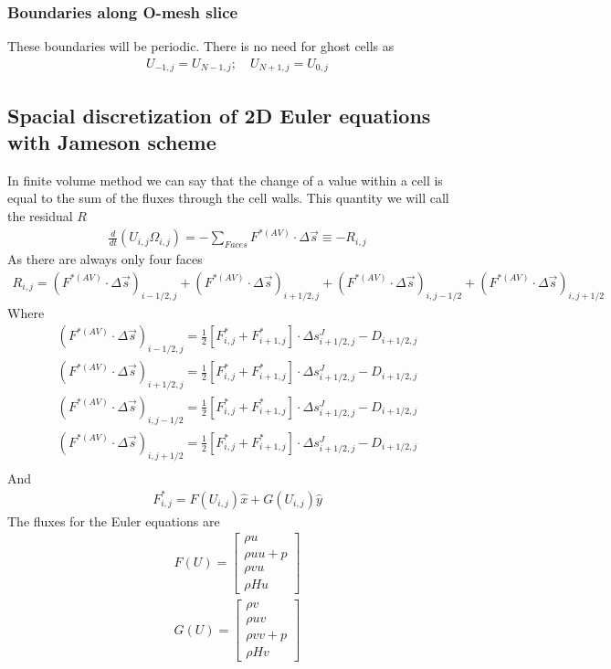 \documentclass[11pt]{article}
\begin{document}
		\subsubsection{Boundaries along O-mesh slice}
		These boundaries will be periodic. There is no need for ghost cells as
			\begin{align}
			U_{-1,j} = U_{N-1,j}; \quad U_{N+1,j} = U_{0,j}
			\end{align}
	\subsection{Spacial discretization of 2D Euler equations with Jameson scheme}
	In finite volume method we can say that the change of a value within a cell is equal to the sum of the fluxes through the cell walls.  This quantity we will call the residual $R$
		\begin{align}
		\frac{d}{dt} (U_{i,j}\Omega_{i,j}) = -\sum_{Faces} F^{*(AV)} \cdot \Delta \vec s \equiv -R_{i,j}
		\end{align}
	As there are always only four faces
		\begin{align}
		R_{i,j} = (F^{*(AV)} \cdot \Delta \vec s)_{i-1/2,j} + (F^{*(AV)} \cdot \Delta \vec s)_{i+1/2,j} + (F^{*(AV)} \cdot \Delta \vec s)_{i,j-1/2} + (F^{*(AV)} \cdot \Delta \vec s)_{i,j+1/2}
		\end{align}
	Where
		\begin{align}
		(F^{*(AV)} \cdot \Delta \vec s)_{i-1/2,j} = \frac{1}{2} \left[F_{i,j}^* + F_{i+1,j}^* \right] \cdot \Delta s_{i+1/2,j}^J - D_{i+1/2,j} \\
		(F^{*(AV)} \cdot \Delta \vec s)_{i+1/2,j} = \frac{1}{2} \left[F_{i,j}^* + F_{i+1,j}^* \right] \cdot \Delta s_{i+1/2,j}^J - D_{i+1/2,j} \\
		(F^{*(AV)} \cdot \Delta \vec s)_{i,j-1/2} = \frac{1}{2} \left[F_{i,j}^* + F_{i+1,j}^* \right] \cdot \Delta s_{i+1/2,j}^J - D_{i+1/2,j} \\
		(F^{*(AV)} \cdot \Delta \vec s)_{i,j+1/2} = \frac{1}{2} \left[F_{i,j}^* + F_{i+1,j}^* \right] \cdot \Delta s_{i+1/2,j}^J - D_{i+1/2,j} \\
		\end{align}
	And
		\begin{align}
		F_{i,j}^* = F(U_{i,j})\hat{x} + G(U_{i,j})\hat{y}
		\end{align}
	The fluxes for the Euler equations are
		\begin{align}
		F(U) = \begin{bmatrix}
		\rho u \\ \rho uu + p\\ \rho vu \\ \rho H u
		\end{bmatrix} \\
		G(U) = \begin{bmatrix}
		\rho v \\ \rho uv \\ \rho vv + p\\ \rho H v
		\end{bmatrix}
		\end{align}
\end{document}
